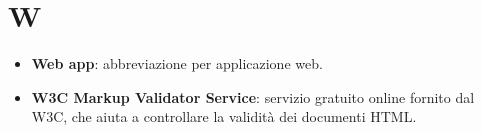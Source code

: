 \newpage
\section{W}

\begin{itemize}
	\item \textbf{Web app}: abbreviazione per applicazione web.
	\item \textbf{W3C Markup Validator Service}: servizio gratuito online fornito dal W3C, che aiuta a controllare la validità dei documenti HTML.
\end{itemize}

